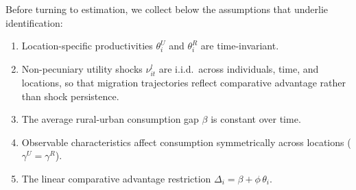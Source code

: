 \documentclass[12pt]{article}
\begin{document}




Before turning to estimation, we collect below the assumptions that underlie identification:
\begin{enumerate}[label=\textup{(A\arabic*)},leftmargin=*,itemsep=2pt]
    \item Location-specific productivities $\theta_i^U$ and $\theta_i^R$ are time-invariant.
    \item Non-pecuniary utility shocks $\nu_{it}^l$ are i.i.d.\ across individuals, time, and locations, so that migration trajectories reflect comparative advantage rather than shock persistence.
    \item The average rural-urban consumption gap $\beta$ is constant over time.
    \item Observable characteristics affect consumption symmetrically across locations ($\gamma^U = \gamma^R$).
    \item The linear comparative advantage restriction $\Delta_i = \beta + \phi\,\theta_i$.
\end{enumerate}
\end{document}
